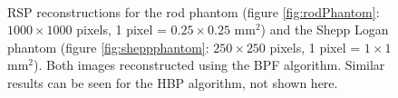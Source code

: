 \documentclass[11pt,a4paper]{article}
\begin{document}
\begin{figure}[!htb]
  \hspace*{\fill}%
  \hfill%
  \hspace*{\fill}\\
  \caption{RSP reconstructions for the rod phantom (figure \ref{fig:rodPhantom}: $1000 \times 1000$ pixels, 1 pixel = $0.25 \times 0.25$ mm$^2$) and the Shepp Logan phantom (figure \ref{fig:sheppphantom}: $250 \times 250$ pixels, 1 pixel = $1 \times 1$ mm$^2$). Both images reconstructed using the BPF algorithm. Similar results can be seen for the HBP algorithm, not shown here.}
  \label{fig:reconstruction}
\end{figure}
\end{document}
